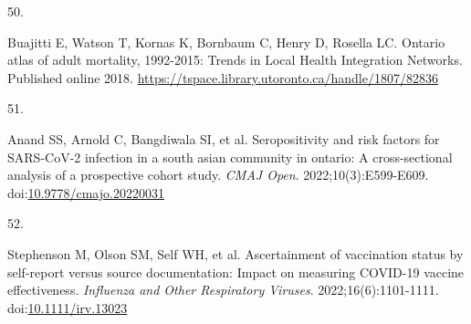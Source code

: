 \documentclass[
  letterpaper,
  DIV=11,
  numbers=noendperiod]{scrartcl}
\newlength{\cslhangindent}
\newlength{\csllabelwidth}
\newlength{\cslentryspacingunit} %
\newenvironment{CSLReferences}[2] %
 {%
  \setlength{\parindent}{0pt}
  \ifodd #1
  \let\oldpar\par
  \def\par{\hangindent=\cslhangindent\oldpar}
  \fi
  \setlength{\parskip}{#2\cslentryspacingunit}
 }%
 {}
\newcommand{\CSLLeftMargin}[1]{\parbox[t]{\csllabelwidth}{#1}}
\newcommand{\CSLRightInline}[1]{\parbox[t]{\linewidth - \csllabelwidth}{#1}\break}
\begin{document}
\begin{CSLReferences}{0}{0}
\leavevmode{}%
\CSLLeftMargin{50. }%
\CSLRightInline{Buajitti E, Watson T, Kornas K, Bornbaum C, Henry D,
Rosella LC. Ontario atlas of adult mortality, 1992-2015: Trends in
{L}ocal {H}ealth {I}ntegration {N}etworks. Published online 2018.
\url{https://tspace.library.utoronto.ca/handle/1807/82836}}

\leavevmode{}%
\CSLLeftMargin{51. }%
\CSLRightInline{Anand SS, Arnold C, Bangdiwala SI, et al. Seropositivity
and risk factors for {SARS}-{CoV}-2 infection in a south asian community
in ontario: A cross-sectional analysis of a prospective cohort study.
\emph{{CMAJ} Open}. 2022;10(3):E599-E609.
doi:\href{https://doi.org/10.9778/cmajo.20220031}{10.9778/cmajo.20220031}}

\leavevmode{}%
\CSLLeftMargin{52. }%
\CSLRightInline{Stephenson M, Olson SM, Self WH, et al. Ascertainment of
vaccination status by self-report versus source documentation: Impact on
measuring {COVID}-19 vaccine effectiveness. \emph{Influenza and Other
Respiratory Viruses}. 2022;16(6):1101-1111.
doi:\href{https://doi.org/10.1111/irv.13023}{10.1111/irv.13023}}

\end{CSLReferences}
\end{document}

